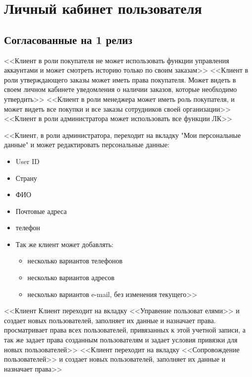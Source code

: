 \section{Личный кабинет пользователя}

\ifcand
\subsection{Согласованные на 1 релиз}
\fi
{}
{
<<Клиент в роли покупателя не может использовать функции управления аккаунтами и может смотреть историю только по своим заказам>>
}
{
<<Клиент в роли утверждающего заказы может иметь права покупателя. Может видеть в своем личном кабинете уведомления о наличии заказов, которые необходимо утвердить>>
}
{
<<Клиент в роли менеджера может иметь роль покупателя, и может видеть все покупки и все заказы сотрудников своей организации>>
}
{
<<Клиент в роли администратора может использовать все функции ЛК>>
}
{
<<Клиент, в роли администратора, переходит на вкладку "Мои персональные данные" и может редактировать персональные данные:
\begin{itemize}
	\item User ID
	\item Страну
	\item ФИО
	\item Почтовые адреса
	\item телефон
	\item Так же клиент может добавлять:
		\begin{itemize}
		\item несколько вариантов телефонов
		\item несколько вариантов адресов
		\item несколько вариантов e-mail, без изменения текущего>>
		\end{itemize}
\end{itemize}
}
{
<<Клиент Клиент переходит на вкладку <<Управение пользоват елями>> и создает новых пользователей, заполняет их данные и назначает права. просматривает права всех пользователей, привязанных к этой учетной записи, а так же задает права созданным пользователям и задает условия привязки для новых пользователей>>
}
{
<<Клиент переходит на вкладку <<Сопровождение пользователей>> и создает новых пользователей, заполняет их данные и назначает права>>
}
\ifcand
